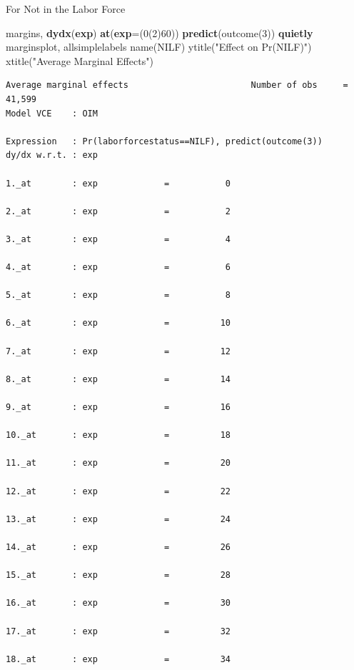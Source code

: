 \documentclass[
]{book}
\newenvironment{Shaded}{\begin{snugshade}}{\end{snugshade}}
\newcommand{\BaseNTok}[1]{\textcolor[rgb]{0.00,0.00,0.81}{#1}}
\newcommand{\FunctionTok}[1]{\textcolor[rgb]{0.13,0.29,0.53}{\textbf{#1}}}
\newcommand{\KeywordTok}[1]{\textcolor[rgb]{0.13,0.29,0.53}{\textbf{#1}}}
\newcommand{\NormalTok}[1]{#1}
\newcommand{\StringTok}[1]{\textcolor[rgb]{0.31,0.60,0.02}{#1}}
\begin{document}
For Not in the Labor Force

\begin{Shaded}
\begin{Highlighting}[]
\NormalTok{margins, }\KeywordTok{dydx}\NormalTok{(}\FunctionTok{exp}\NormalTok{) }\FunctionTok{at}\NormalTok{(}\FunctionTok{exp}\NormalTok{=(0(2)60)) }\KeywordTok{predict}\NormalTok{(outcome(3))}
\KeywordTok{quietly}\NormalTok{ marginsplot, allsimplelabels }\BaseNTok{name}\NormalTok{(NILF) }\BaseNTok{ytitle}\NormalTok{(}\StringTok{"Effect on Pr(NILF)"}\NormalTok{) }\BaseNTok{xtitle}\NormalTok{(}\StringTok{"Average Marginal Effects"}\NormalTok{)}
\end{Highlighting}
\end{Shaded}

\begin{verbatim}
Average marginal effects                        Number of obs     =     41,599
Model VCE    : OIM

Expression   : Pr(laborforcestatus==NILF), predict(outcome(3))
dy/dx w.r.t. : exp

1._at        : exp             =           0

2._at        : exp             =           2

3._at        : exp             =           4

4._at        : exp             =           6

5._at        : exp             =           8

6._at        : exp             =          10

7._at        : exp             =          12

8._at        : exp             =          14

9._at        : exp             =          16

10._at       : exp             =          18

11._at       : exp             =          20

12._at       : exp             =          22

13._at       : exp             =          24

14._at       : exp             =          26

15._at       : exp             =          28

16._at       : exp             =          30

17._at       : exp             =          32

18._at       : exp             =          34


\end{verbatim}
\end{document}
